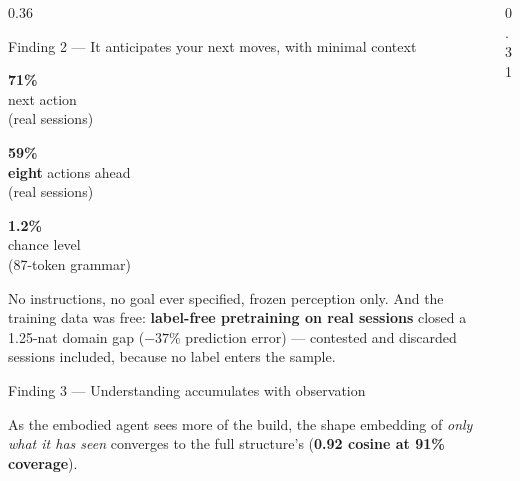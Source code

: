 \documentclass[final]{beamer}
\newcommand{\stattile}[3]{%
  \begin{minipage}[t][7.5cm][c]{#1}\centering
    {\fontsize{64}{68}\selectfont\bfseries\color{micagreen}#2}\\[0.5em]
    {\normalsize #3}
  \end{minipage}}
\begin{document}
\begin{frame}[t]
\begin{columns}[t]
\begin{column}{0.36\textwidth}
\begin{exampleblock}{Finding 2 --- It anticipates your next moves, with minimal context}
\begin{center}
\stattile{0.29\linewidth}{71\%}{next action\\(real sessions)}\hfill
\stattile{0.29\linewidth}{59\%}{\textbf{eight} actions ahead\\(real sessions)}\hfill
\stattile{0.29\linewidth}{1.2\%}{chance level\\(87-token grammar)}
\end{center}
\vspace{0.3em}
No instructions, no goal ever specified, frozen perception only. And the
training data was free: \textbf{label-free pretraining on real sessions}
closed a 1.25-nat domain gap ($-37\%$ prediction error) --- contested and
discarded sessions included, because no label enters the sample.
\end{exampleblock}

\begin{exampleblock}{Finding 3 --- Understanding accumulates with observation}
\begin{center}
\end{center}
As the embodied agent sees more of the build, the shape embedding of
\emph{only what it has seen} converges to the full structure's
(\textbf{0.92 cosine at 91\% coverage}).
\end{exampleblock}

\end{column}

\begin{column}{0.31\textwidth}


\end{column}
\end{columns}
\end{frame}
\end{document}
